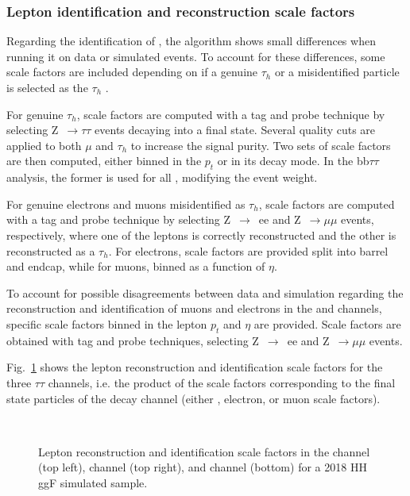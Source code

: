 \documentclass[../main.tex]{subfiles}
\begin{document}
\subsubsection*{Lepton identification and reconstruction scale factors}

Regarding the identification of \tauh{}, the \deeptau{} algorithm shows small differences when running it on data or simulated events. To account for these differences, some scale factors are included depending on if a genuine $\tau_h$ or a misidentified particle is selected as the $\tau_h$ \cite{tau_performance_2022}. 

For genuine $\tau_h$, scale factors are computed with a tag and probe technique by selecting Z~$\to\tau\tau$ events decaying into a \taumu\tauh{} final state. Several quality cuts are applied to both $\mu$ and $\tau_h$ to increase the signal purity. Two sets of scale factors are then computed, either binned in the \tauh{} $p_t$ or in its decay mode. In the bb$\tau\tau$ analysis, the former is used for all \tauh{}, modifying the event weight.

For genuine electrons and muons misidentified as $\tau_h$, scale factors are computed with a tag and probe technique by selecting Z~$\to$~ee and Z~$\to\mu\mu$ events, respectively, where one of the leptons is correctly reconstructed and the other is reconstructed as a $\tau_h$. For electrons, scale factors are provided split into barrel and endcap, while for muons, binned as a function of $\eta$.

To account for possible disagreements between data and simulation regarding the reconstruction and identification of muons and electrons in the \taumu\tauh{} and \taue\tauh{} channels, specific scale factors binned in the lepton $p_t$ and $\eta$ are provided. Scale factors are obtained with tag and probe techniques, selecting Z~$\to$~ee and Z~$\to\mu\mu$ events.

Fig.~\ref{hh:fig:lepton_sf} shows the lepton reconstruction and identification scale factors for the three $\tau\tau$ channels, i.e. the product of the scale factors corresponding to the final state particles of the decay channel (either \deeptau{}, electron, or muon scale factors).

\begin{figure}[h!]
\begin{center}
\\
\end{center}
\caption[Lepton reconstruction and identification scale factors]{Lepton reconstruction and identification scale factors in the \taumu\tauh{} channel (top left), \taue\tauh{} channel (top right), and \tauh\tauh{} channel (bottom) for a 2018 HH ggF simulated sample.}
\label{hh:fig:lepton_sf}
\end{figure}
\end{document}
